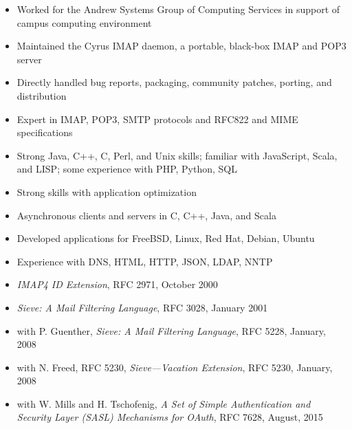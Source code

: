 \documentclass[letterpaper,12pt,twoside]{article}
\begin{document}
\vspace{-18pt}
\begin{itemize}
\item Worked for the Andrew Systems Group of Computing Services in
  support of campus computing environment
\item Maintained the Cyrus IMAP daemon, a portable, black-box IMAP and
  POP3 server
\item Directly handled bug reports, packaging, community patches,
  porting, and distribution
\end{itemize}


\vspace{-6pt}
\begin{itemize}
\item Expert in IMAP, POP3, SMTP protocols and RFC822 and MIME specifications
\item Strong Java, C++, C, Perl, and Unix skills; familiar with JavaScript,
  Scala, and LISP; some experience with PHP, Python, SQL
\item Strong skills with application optimization
\item Asynchronous clients and servers in C, C++, Java, and Scala
\item Developed applications for FreeBSD, Linux, Red Hat, Debian, Ubuntu
\item Experience with DNS, HTML, HTTP, JSON, LDAP, NNTP
\end{itemize}

\vspace{-6pt}
\begin{itemize}
\item {\sl IMAP4 ID Extension}, RFC 2971, October 2000
\item {\sl Sieve: A Mail Filtering Language}, RFC 3028, January 2001
\item with P. Guenther, {\sl Sieve: A Mail Filtering Language}, RFC
  5228, January, 2008
\item with N. Freed, RFC 5230, {\sl Sieve---Vacation Extension}, RFC
  5230, January, 2008
\item with W. Mills and H. Tschofenig, {\sl A Set of Simple Authentication and
  Security Layer (SASL) Mechanisms for OAuth}, RFC 7628, August, 2015
\end{itemize}
\end{document}
